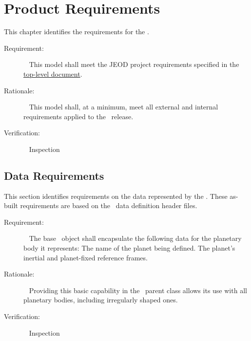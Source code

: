 \chapter{Product Requirements}\label{ch:reqt}

This chapter identifies the requirements for the \planetDesc.

\label{reqt:toplevel}
\begin{description}
\item[Requirement:]\ \newline
  This model shall meet the JEOD project requirements specified in
  the \JEODid\
  \hyperref{file:\JEODHOME/docs/JEOD.pdf}{part1}{reqt}{ top-level
  document}.
\item[Rationale:]\ \newline
  This model shall, at a minimum, meet all external and internal requirements 
  applied to the \JEODid\ release.
\item[Verification:]\ \newline
     Inspection
\end{description}

\section{Data Requirements}\label{sec:data_reqts}
This section identifies requirements on the data represented by the \planetDesc.
These as-built requirements are based on the \planetDesc\ data definition header 
files.

\label{reqt:base_planet_data_encapsulation}
\begin{description}
  \item[Requirement:]\ \newline
    The base \planetDesc\ object shall encapsulate the following
    data for the planetary body it represents:
    The name of the planet being defined.
    The planet's inertial and planet-fixed reference frames.

  \item[Rationale:]\ \newline
    Providing this basic capability in the \planetDesc\ parent class allows
    its use with all planetary bodies, including irregularly shaped ones.

  \item[Verification:]\ \newline
    Inspection
\end{description}

